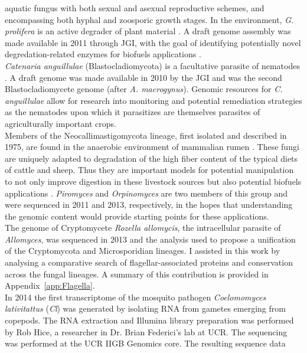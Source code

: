 aquatic fungus with both sexual and asexual reproductive schemes, and
encompassing both hyphal and zoosporic growth stages. In the
environment, \textit{G. prolifera} is an active degrader of plant
material \cite{Karling1977}. A draft genome assembly was made available in
2011 through JGI, with the goal of identifying potentially novel
degredation-related enzymes for biofuels applications \cite{Chang2015}. \\
\indent \textit{Catenaria anguillulae} (Blastocladiomycota) is a
facultative parasite of nematodes \cite{Deacon1997}. A draft genome
was made available in 2010 by the JGI and was the second
Blastocladiomycete genome (after \textit{A. macrogynus}). Genomic
resources for \textit{C. anguillulae} allow for research into
monitoring and potential remediation strategies as the nematodes upon
which it parasitizes are themselves parasites of agriculturally
important crops.\\
\indent Members of the Neocallimastigomycota lineage, first isolated
and described in 1975, are found in the anaerobic environment of
mammalian rumen \cite{Orpin1975}. These fungi are uniquely adapted to
degradation of the high fiber content of the typical diets of cattle
and sheep. Thus they are important models for potential manipulation
to not only improve digestion in these livestock sources \cite{Ho1995}
but also potential biofuels applications
\cite{Youssef2013,Gruninger2014}. \textit{Piromyces} and \textit{Orpinomyces} are
two members of this group and were sequenced in 2011 and 2013,
respectively, in the hopes that understanding the genomic content
would provide starting points for these applications. \\
\indent The genome of Cryptomycete \textit{Rozella allomycis}, the
intracellular parasite of \textit{Allomyces}, was sequenced in 2013
\cite{James2013} and the analysis used to propose a unification of the
Cryptomycota and Microsporidian lineages. I assisted in this work 
by analysing a comparative search of flagellar-associated proteins
and conservation across the fungal lineages. A summary of this contribution
is provided in Appendix~\ref{app:Flagella}.\\
\indent In 2014 the first transcriptome of the mosquito pathogen
\textit{Coelomomyces lativitattus} (\textit{Cl}) was generated by
isolating RNA from gametes emerging from copepods. The RNA extraction
and Illumina library preparation was performed by Rob Hice, a
researcher in Dr. Brian Federici's lab at UCR. The sequencing was
performed at the UCR IIGB Genomics core. The resulting sequence data
